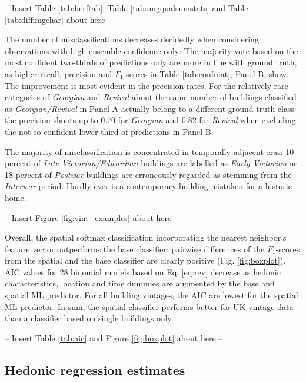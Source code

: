 \documentclass[]{article}
\begin{document}
\begin{center}
  -- Insert Table \ref{tab:herftab}, Table \ref{tab:imgqualsumstats} and Table \ref{tab:diffimgchar} about here --
\end{center}

The number of misclassifications decreases decidedly when considering
observations with high ensemble confidence only: The majority vote based
on the most confident two-thirds of predictions only are more in line
with ground truth, as higher recall, precision and \(F_1\)-scores in
Table \ref{tab:confmat}, Panel B, show. The improvement is most evident
in the precision rates. For the relatively rare categories of
\emph{Georgian} and \emph{Revival} about the same number of buildings
classified as \emph{Georgian/Revival} in Panel A actually belong to a
different ground truth class -- the precision shoots up to 0.70 for
\emph{Georgian} and 0.82 for \emph{Revival} when excluding the not so
confident lower third of predictions in Panel B.

The majority of misclassification is concentrated in temporally adjacent
eras: 10 percent of \emph{Late Victorian/Edwardian} buildings are
labelled as \emph{Early Victorian} or 18 percent of \emph{Postwar}
buildings are erroneously regarded as stemming from the \emph{Interwar}
period. Hardly ever is a contemporary building mistaken for a historic
home.

\begin{center}
  -- Insert Figure \ref{fig:vint_examples} about here --
\end{center}

Overall, the spatial softmax classification incorporating the nearest
neighbor's feature vector outperforms the base classifier: pairwise
differences of the \(F_1\)-scores from the spatial and the base
classifier are clearly positive (Fig. \ref{fig:boxplot}). AIC values for
28 binomial models based on Eq. \ref{eq:rev} decrease as hedonic
characteristics, location and time dummies are augmented by the base and
spatial ML predictor. For all building vintages, the AIC are lowest for
the spatial ML predictor. In sum, the spatial classifier performs better
for UK vintage data than a classifier based on single buildings only.

\begin{center}
  -- Insert Table \ref{tab:aic} and Figure \ref{fig:boxplot} about here --
\end{center}

\hypertarget{hedonic-regression-estimates}{%
\subsection{Hedonic regression
estimates}\label{hedonic-regression-estimates}}
\end{document}
